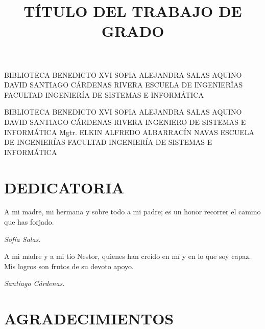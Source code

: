 \documentclass[spanish]{ieee_upb}
\title{TÍTULO DEL TRABAJO DE GRADO}
\date{\the\year}
\begin{document}
{BIBLIOTECA BENEDICTO XVI}
{SOFIA ALEJANDRA SALAS AQUINO} {DAVID SANTIAGO CÁRDENAS RIVERA}
{ESCUELA DE INGENIERÍAS}
{FACULTAD INGENIERÍA DE SISTEMAS E INFORMÁTICA}

\newpage
{}
{BIBLIOTECA BENEDICTO XVI}
{SOFIA ALEJANDRA SALAS AQUINO} {DAVID SANTIAGO CÁRDENAS RIVERA}
{INGENIERO DE SISTEMAS E INFORMÁTICA}
{Mgtr. ELKIN ALFREDO ALBARRACÍN NAVAS}
{ESCUELA DE INGENIERÍAS}
{FACULTAD INGENIERÍA DE SISTEMAS E INFORMÁTICA}

\newpage
\section*{DEDICATORIA}

A mi madre, mi hermana y sobre todo a mi padre;
es un honor recorrer el camino que has forjado.

\vspace{-0.30cm}
\begin{flushright}
\textit{ Sofía Salas.}
\end{flushright}

A mi madre y a mi tío Nestor, quienes han creído en mí y en lo que soy capaz.
Mis logros son frutos de su devoto apoyo.

\vspace{-0.30cm}
\begin{flushright}
\textit{ Santiago Cárdenas.}
\end{flushright}


\clearpage
\section*{AGRADECIMIENTOS}
\end{document}
